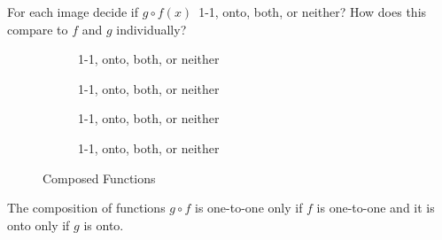 \begin{practiceprob}
    For each image decide if \(g\circ f(x)\)\  1-1, onto, both, or neither?  How does this compare to \(f\) and \(g\) individually?
    \begin{figure}[H]
        \centering
        \begin{subfigure}{0.45\textwidth}
            \caption{1-1, onto, both, or neither}
            \label{fig:composition2}
        \end{subfigure}
        \begin{subfigure}{0.45\textwidth}
            \caption{1-1, onto, both, or neither}
            \label{fig:composition1}
        \end{subfigure}

\vspace{6\baselineskip}

        \begin{subfigure}{0.45\textwidth}
            \caption{1-1, onto, both, or neither}
            \label{fig:composition3}
        \end{subfigure}
        \begin{subfigure}{0.45\textwidth}
            \caption{1-1, onto, both, or neither}
            \label{fig:composition4}
        \end{subfigure}
        \caption{Composed Functions}
        \label{fig:function_comp}
    \end{figure}
\vspace{6\baselineskip}
\end{practiceprob}

\begin{thm}
    The composition of functions \(g\circ f\) is one-to-one only if \(f\) is one-to-one and it is onto only if \(g\) is onto.
\end{thm}

\clearpage

